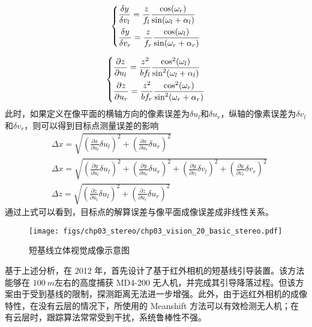 \begin{equation}
\left\{ \begin{gathered}
\frac{{\delta y}}{{\delta {v_l}}} = \frac{z}{{{f_l}}}\frac{{\cos ({\omega _r})}}{{\sin ({\omega _l} + {\alpha _l})}} \hfill \\
\frac{{\delta y}}{{\delta {v_r}}} = \frac{z}{{{f_r}}}\frac{{\cos ({\omega _l})}}{{\sin ({\omega _r} + {\alpha _r})}} \hfill \\ 
\end{gathered}  \right.
\end{equation}


\begin{equation}
\left\{ \begin{gathered}
\frac{{\partial z}}{{\partial {u_l}}} = \frac{{{z^2}}}{{b{f_l}}}\frac{{{{\cos }^2}({\omega _l})}}{{{{\sin }^2}({\omega _l} + {\alpha _l})}} \hfill \\
\frac{{\partial z}}{{\partial {u_r}}} = \frac{{{z^2}}}{{b{f_r}}}\frac{{{{\cos }^2}({\omega _r})}}{{{{\sin }^2}({\omega _r} + {\alpha _r})}} \hfill \\ 
\end{gathered}  \right.
\end{equation}
此时，如果定义在像平面的横轴方向的像素误差为$\delta u_l$和$\delta u_r$，纵轴的像素误差为$\delta v_l$和$\delta v_r$，则可以得到目标点测量误差的影响
\begin{align}
&\Delta x = \sqrt{(\frac{\partial x}{\partial u_l} \delta u_l)^2+(\frac{\partial x}{\partial u_r} \delta u_r)^2} \\
&\Delta x = \sqrt{(\frac{\partial y}{\partial u_l} \delta u_l)^2+(\frac{\partial y}{\partial u_r} \delta u_r)^2+(\frac{\partial y}{\partial v_l} \delta v_l)^2+(\frac{\partial y}{\partial v_r} \delta v_r)^2}\\
&\Delta z = \sqrt{(\frac{\partial z}{\partial u_l} \delta u_l)^2+(\frac{\partial z}{\partial u_r} \delta u_r)^2}
\end{align}
通过上式可以看到，目标点的解算误差与像平面成像误差成非线性关系。

\begin{figure}[!tb]
	\centering
	\texttt{[image: figs/chp03\_stereo/chp03\_vision\_20\_basic\_stereo.pdf]}	
	\caption{短基线立体视觉成像示意图}
	\label{fig:chp03_vision_20_basic_stereo}
\end{figure}

基于上述分析，在 2012 年，首先设计了基于红外相机的短基线引导装置。该方法能够在 $100\ m$左右的高度捕获 MD4-200 无人机，并完成其引导降落过程。但该方案由于受到基线的限制，探测距离无法进一步增强。此外，由于远红外相机的成像特性，在没有云层的情况下，所使用的 Meanshift 方法可以有效检测无人机；在有云层时，跟踪算法常常受到干扰，系统鲁棒性不强。

